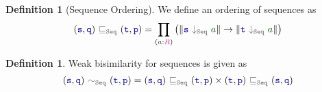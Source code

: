 \documentclass[twoside,11pt,openright]{report}
\theoremstyle{plain} %
\theoremstyle{definition}
\newtheorem{defn}[thm]{Definition}%
\theoremstyle{remark}
\newcommand*{\term}[1]{\textcolor{green!30!black}{#1}} %
\newcommand*{\type}[1]{\textcolor{magenta!90!black}{#1}}
\newcommand*{\relation}[1]{\textcolor{gray!75!black}{\ensuremath{\mathtt{#1}}}}
\newcommand*{\function}[1]{\textcolor{blue!60!black}{\ensuremath{\mathtt{#1}}}}
\begin{document}
\begin{defn}[Sequence Ordering] We define an ordering of sequences as
  \begin{equation}
    (\function{s},\function{q})~\relation{\sqsubseteq_{Seq}}~(\function{t},\function{p}) = \prod_{(\term{a} : \type{R})} \left(\|\function{s}~\relation{\downarrow_{Seq}}~\term{a}\| \rightarrow \| \function{t}~\relation{\downarrow_{Seq}}~\term{a}\|\right)
  \end{equation}
\end{defn}
\begin{defn} Weak bisimilarity for sequences is given as
  \begin{equation}
    (\function{s},\function{q})~\relation{\sim_{Seq}}~(\function{t},\function{p}) = (\function{s},\function{q})~\relation{\sqsubseteq_{Seq}}~(\function{t},\function{p}) \times (\function{t},\function{p})~\relation{\sqsubseteq_{Seq}}~(\function{s},\function{q})
  \end{equation}
\end{defn}
\end{document}
